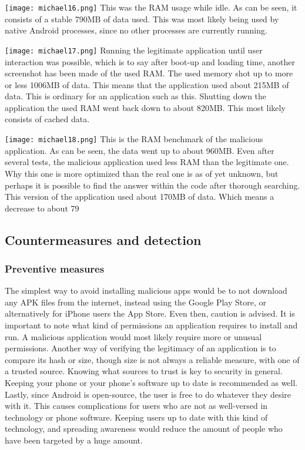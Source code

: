 \texttt{[image: michael16.png]}
This was the RAM usage while idle. As can be seen, it consists of a stable 790MB of data used. This was most likely being used by native Android processes, since no other processes are currently running.

\texttt{[image: michael17.png]}
Running the legitimate application until user interaction was possible, which is to say after boot-up and loading time, another screenshot has been made of the used RAM. The used memory shot up to more or less 1006MB of data. This means that the application used about 215MB of data. This is ordinary for an application such as this. Shutting down the application the used RAM went back down to about 820MB. This most likely consists of cached data.

\texttt{[image: michael18.png]}
This is the RAM benchmark of the malicious application. As can be seen, the data went up to about 960MB. Even after several tests, the malicious application used less RAM than the legitimate one. Why this one is more optimized than the real one is as of yet unknown, but perhaps it is possible to find the answer within the code after thorough searching. This version of the application used about 170MB of data. Which means a decrease to about 79%

\newpage
\subsection{Countermeasures and detection}

\subsubsection{Preventive measures}

The simplest way to avoid installing malicious apps would be to not download any APK files from the internet, instead using the Google Play Store, or alternatively for iPhone users the App Store. Even then, caution is advised. It is important to note what kind of permissions an application requires to install and run. A malicious application would most likely require more or unusual permissions. Another way of verifying the legitimacy of an application is to compare its hash or size, though size is not always a reliable measure, with one of a trusted source. Knowing what sources to trust is key to security in general. Keeping your phone or your phone’s software up to date is recommended as well. Lastly, since Android is open-source, the user is free to do whatever they desire with it. This causes complications for users who are not as well-versed in technology or phone software. Keeping users up to date with this kind of technology, and spreading awareness would reduce the amount of people who have been targeted by a huge amount.

